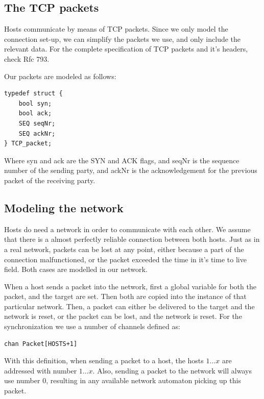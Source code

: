 \documentclass[twocolumn]{article}
\begin{document}
\subsection{The TCP packets}
Hosts communicate by means of TCP packets. Since we only model the connection set-up, we can simplify the packets we use, and only include the relevant data. For the complete specification of TCP packets and it's headers, check Rfc 793.

Our packets are modeled as follows:
\begin{verbatim}
typedef struct {
    bool syn;
    bool ack;
    SEQ seqNr;
    SEQ ackNr;
} TCP_packet;
\end{verbatim}
Where syn and ack are the SYN and ACK flags, and seqNr is the sequence number of the sending party, and ackNr is the acknowledgement for the previous packet of the receiving party.

\subsection{Modeling the network}
Hosts do need a network in order to communicate with each other. We assume that there is a almost perfectly reliable connection between both hosts. Just as in a real network, packets can be lost at any point, either because a part of the connection malfunctioned, or the packet exceeded the time in it's time to live field. Both cases are modelled in our network.

When a host sends a packet into the network, first a global variable for both the packet, and the target are set. Then both are copied into the instance of that particular network. Then, a packet can either be delivered to the target and the network is reset, or the packet can be lost, and the network is reset. For the synchronization we use a number of channels defined as:
\begin{verbatim}chan Packet[HOSTS+1]
\end{verbatim}
With this definition, when sending a packet to a host, the hosts $1\ldots x$ are addressed with number $1\ldots x$. Also, sending a packet to the network will always use number 0, resulting in any available network automaton picking up this packet.
\end{document}
